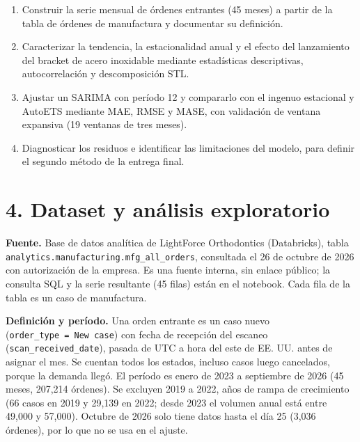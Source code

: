 \documentclass[
  spanish,
  11pt,
]{article}
\providecommand{\tightlist}{%
  \setlength{\itemsep}{0pt}\setlength{\parskip}{0pt}}
\begin{document}
\begin{enumerate}
\def\labelenumi{\arabic{enumi}.}
\tightlist
\item
  Construir la serie mensual de órdenes entrantes (45 meses) a partir de
  la tabla de órdenes de manufactura y documentar su definición.
\item
  Caracterizar la tendencia, la estacionalidad anual y el efecto del
  lanzamiento del bracket de acero inoxidable mediante estadísticas
  descriptivas, autocorrelación y descomposición STL.
\item
  Ajustar un SARIMA con período 12 y compararlo con el ingenuo
  estacional y AutoETS mediante MAE, RMSE y MASE, con validación de
  ventana expansiva (19 ventanas de tres meses).
\item
  Diagnosticar los residuos e identificar las limitaciones del modelo,
  para definir el segundo método de la entrega final.
\end{enumerate}

\section{4. Dataset y análisis
exploratorio}\label{dataset-y-anuxe1lisis-exploratorio}

\textbf{Fuente.} Base de datos analítica de LightForce Orthodontics
(Databricks), tabla \texttt{analytics.manufacturing.mfg\_all\_orders},
consultada el 26 de octubre de 2026 con autorización de la empresa. Es
una fuente interna, sin enlace público; la consulta SQL y la serie
resultante (45 filas) están en el notebook. Cada fila de la tabla es un
caso de manufactura.

\textbf{Definición y período.} Una orden entrante es un caso nuevo
(\texttt{order\_type\ =\ \textquotesingle{}New\ case\textquotesingle{}})
con fecha de recepción del escaneo (\texttt{scan\_received\_date}),
pasada de UTC a hora del este de EE. UU. antes de asignar el mes. Se
cuentan todos los estados, incluso casos luego cancelados, porque la
demanda llegó. El período es enero de 2023 a septiembre de 2026 (45
meses, 207,214 órdenes). Se excluyen 2019 a 2022, años de rampa de
crecimiento (66 casos en 2019 y 29,139 en 2022; desde 2023 el volumen
anual está entre 49,000 y 57,000). Octubre de 2026 solo tiene datos
hasta el día 25 (3,036 órdenes), por lo que no se usa en el ajuste.
\end{document}
